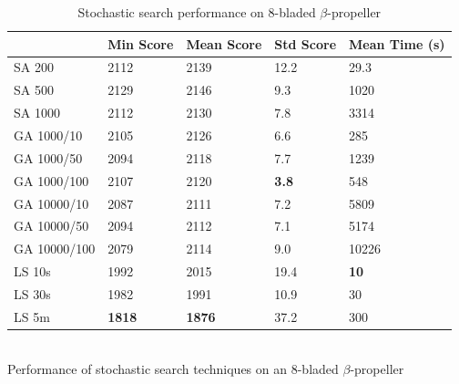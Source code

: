 \documentclass[blockstyle,times,preprint]{sigplanconf}
\begin{document}
\begin{small}
\begin{table}[htb]
\centering
\caption{Stochastic search performance on 8-bladed $\beta$-propeller \label{ss-propeller}}
\begin{tabular}{lllll}
\hline
             & Min Score & Mean Score & Std Score & Mean Time (s) \\
\hline
SA 200       & 2112      & 2139       & 12.2      & 29.3      \\
\hline                                                        
SA 500       & 2129      & 2146       & 9.3       & 1020      \\
\hline                                                        
SA 1000      & 2112      & 2130       & 7.8      & 3314      \\
\hline                                                        
GA 1000/10   & 2105      & 2126       & 6.6      & 285      \\
\hline                                                        
GA 1000/50   & 2094      & 2118       & 7.7      & 1239      \\
\hline                                                        
GA 1000/100  & 2107      & 2120       & \textbf{3.8}      & 548      \\
\hline                                                        
GA 10000/10  & 2087      & 2111       & 7.2      & 5809      \\
\hline                                                        
GA 10000/50  & 2094      & 2112       & 7.1      & 5174      \\
\hline                                                        
GA 10000/100 & 2079      & 2114       & 9.0      & 10226      \\
\hline                                                        
LS 10s       & 1992     & 2015      & 19.4     & \textbf{10}    \\
\hline                                                        
LS 30s       & 1982     & 1991      & 10.9     & 30    \\
\hline                                                        
LS 5m        & \textbf{1818}     & \textbf{1876}      & 37.2     & 300    \\
\hline
\end{tabular}\\
{Performance of stochastic search techniques on an 8-bladed $\beta$-propeller
}
\end{table}
\end{small}
\end{document}
